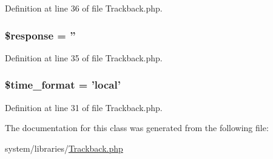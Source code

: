 Definition at line 36 of file Trackback.\-php.

\hypertarget{class_c_i___trackback_af4b6fb1bbc77ccc05f10da3b16935b99}{
\subsubsection[{\$response}]{\setlength{\rightskip}{0pt plus 5cm}\$response = ''}}\label{class_c_i___trackback_af4b6fb1bbc77ccc05f10da3b16935b99}


Definition at line 35 of file Trackback.\-php.

\hypertarget{class_c_i___trackback_a96745a88c8a49f8ed93ec24fa13619cb}{
\subsubsection[{\$time\-\_\-format}]{\setlength{\rightskip}{0pt plus 5cm}\$time\-\_\-format = 'local'}}\label{class_c_i___trackback_a96745a88c8a49f8ed93ec24fa13619cb}


Definition at line 31 of file Trackback.\-php.



The documentation for this class was generated from the following file\-:\begin{DoxyCompactItemize}
\item 
system/libraries/\hyperlink{_trackback_8php}{Trackback.\-php}\end{DoxyCompactItemize}

